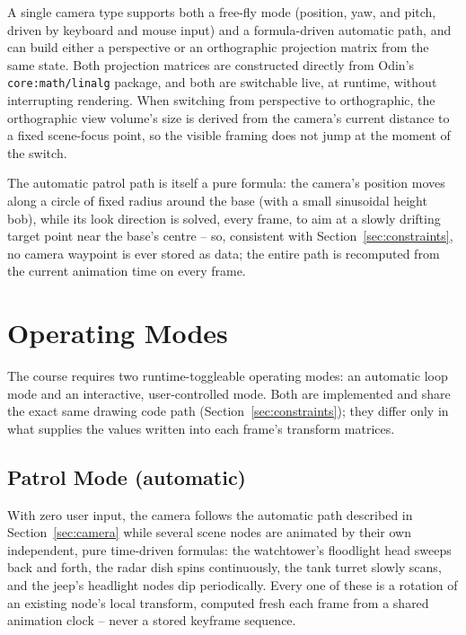 \documentclass[11pt,a4paper]{article}
\begin{document}
A single camera type supports both a free-fly mode (position, yaw, and
pitch, driven by keyboard and mouse input) and a formula-driven
automatic path, and can build either a perspective or an orthographic
projection matrix from the same state. Both projection matrices are
constructed directly from Odin's \texttt{core:math/linalg} package, and
both are switchable live, at runtime, without interrupting rendering.
When switching from perspective to orthographic, the orthographic
view volume's size is derived from the camera's current distance to a
fixed scene-focus point, so the visible framing does not jump at the
moment of the switch.

The automatic patrol path is itself a pure formula: the camera's
position moves along a circle of fixed radius around the base (with a
small sinusoidal height bob), while its look direction is solved, every
frame, to aim at a slowly drifting target point near the base's centre
-- so, consistent with Section~\ref{sec:constraints}, no camera
waypoint is ever stored as data; the entire path is recomputed from the
current animation time on every frame.

\section{Operating Modes}
\label{sec:modes}

The course requires two runtime-toggleable operating modes: an automatic
loop mode and an interactive, user-controlled mode. Both are implemented
and share the exact same drawing code path (Section~\ref{sec:constraints});
they differ only in what supplies the values written into each frame's
transform matrices.

\subsection{Patrol Mode (automatic)}
With zero user input, the camera follows the automatic path described in
Section~\ref{sec:camera} while several scene nodes are animated by their
own independent, pure time-driven formulas: the watchtower's floodlight
head sweeps back and forth, the radar dish spins continuously, the tank
turret slowly scans, and the jeep's headlight nodes dip periodically.
Every one of these is a rotation of an existing node's local transform,
computed fresh each frame from a shared animation clock -- never a
stored keyframe sequence.
\end{document}
